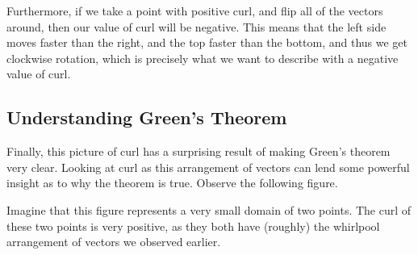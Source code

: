 \documentclass{article}
\begin{document}
    Furthermore, if we take a point with positive curl, and flip all of the vectors around, then our value of curl will be negative.
    This means that the left side moves faster than the right, and the top faster than the bottom, and thus we get clockwise rotation, which is precisely what we want to describe with a negative value of curl.

    \subsection*{Understanding Green's Theorem}
    Finally, this picture of curl has a surprising result of making Green's theorem very clear.
    Looking at curl as this arrangement of vectors can lend some powerful insight as to why the theorem is true.
    Observe the following figure.

    \begin{figure}[!h]
        \centering
    \end{figure}
    Imagine that this figure represents a very small domain of two points.
    The curl of these two points is very positive, as they both have (roughly) the whirlpool arrangement of vectors we observed earlier.
\end{document}
